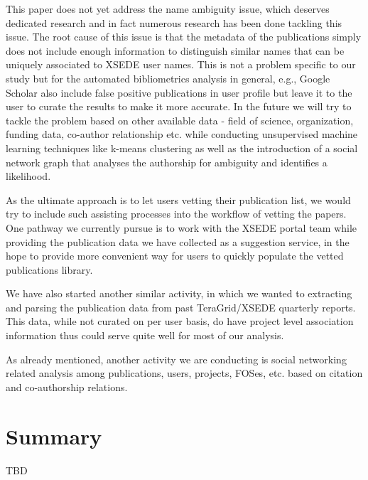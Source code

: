 \documentclass{sig-alternate}
\begin{document}
This paper does not yet address the name ambiguity issue, which deserves dedicated research and in fact numerous research has been done tackling this issue. The root cause of this issue is that the metadata of the publications simply does not include enough information to distinguish similar names that can be uniquely associated to XSEDE user names. This is not a problem specific to our study but for the automated bibliometrics analysis in general, e.g., Google Scholar also include false positive publications in user profile but leave it to the user to curate the results to make it more accurate. In the future we will try to tackle the problem based on other available data - field of science, organization, funding data, co-author relationship etc. while conducting unsupervised machine learning techniques like k-means clustering as well as the introduction of a social network graph that analyses the authorship for ambiguity and identifies a likelihood.
 
As the ultimate approach is to let users vetting their publication list, we would try to include such assisting processes into the workflow of vetting the papers. One pathway we currently pursue is to work with the XSEDE portal team while providing the publication data we have collected as a suggestion service, in the hope to provide more convenient way for users to quickly populate the vetted publications library. 
 
We have also started another similar activity, in which we wanted to extracting and parsing the publication data from past TeraGrid/XSEDE quarterly reports. This data, while not curated on per user basis, do have project level association information thus could serve quite well for most of our analysis. 
 
As already mentioned, another activity we are conducting is social networking related analysis among publications, users, projects, FOSes, etc. based on citation and co-authorship relations. 
 
\section{Summary}

TBD 
 
 
 
\end{document}
